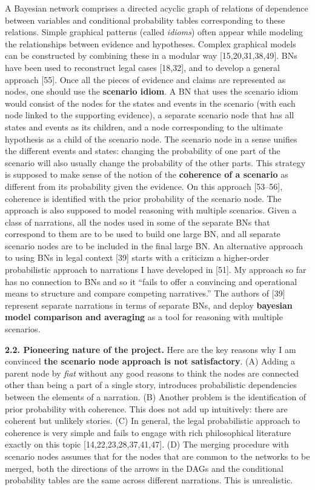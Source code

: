 \documentclass[11pt,dvipsnames,enabledeprecatedfontcommands]{scrartcl}
\begin{document}
A Bayesian network comprises a directed acyclic graph of relations of
dependence between variables and conditional probability tables
corresponding to these relations. Simple graphical patterns (called
\emph{idioms}) often appear while modeling the relationships between
evidence and hypotheses. Complex graphical models can be constructed by
combining these in a modular way {[}15,20,31,38,49{]}. BNs have been
used to reconstruct legal cases {[}18,32{]}, and to develop a general
approach {[}55{]}. Once all the pieces of evidence and claims are
represented as nodes, one should use the \textbf{scenario idiom}. A BN
that uses the scenario idiom would consist of the nodes for the states
and events in the scenario (with each node linked to the supporting
evidence), a separate scenario node that has all states and events as
its children, and a node corresponding to the ultimate hypothesis as a
child of the scenario node. The scenario node in a sense unifies the
different events and states: changing the probability of one part of the
scenario will also usually change the probability of the other parts.
This strategy is supposed to make sense of the notion of the
\textbf{coherence of a scenario} as different from its probability given
the evidence. On this approach {[}53--56{]}, coherence is identified
with the prior probability of the scenario node. The approach is also
supposed to model reasoning with multiple scenarios. Given a class of
narrations, all the nodes used in some of the separate BNs that
correspond to them are to be used to build one large BN, and all
separate scenario nodes are to be included in the final large BN. An
alternative approach to using BNs in legal context {[}39{]} starts with
a criticizm a higher-order probabilistic approach to narrations I have
developed in {[}51{]}. My approach so far has no connection to BNs and
so it ``fails to offer a convincing and operational means to structure
and compare competing narratives.'' The authors of {[}39{]} represent
separate narrations in terms of separate BNs, and deploy
\textbf{bayesian model comparison and averaging} as a tool for reasoning
with multiple scenarios.

\vspace{1mm}

\noindent \large \textbf{2.2. Pioneering nature of the project.}
\normalsize Here are the key reasons why I am convinced
\textbf{the scenario node approach is not satisfactory}. (A) Adding a
parent node by \emph{fiat} without any good reasons to think the nodes
are connected other than being a part of a single story, introduces
probabilistic dependencies between the elements of a narration. (B)
Another problem is the identification of prior probability with
coherence. This does not add up intuitively: there are coherent but
unlikely stories. (C) In general, the legal probabilistic approach to
coherence is very simple and fails to engage with rich philosophical
literature exactly on this topic {[}14,22,23,28,37,41,47{]}. (D) The
merging procedure with scenario nodes assumes that for the nodes that
are common to the networks to be merged, both the directions of the
arrows in the DAGs and the conditional probability tables are the same
across different narrations. This is unrealistic.
\end{document}
